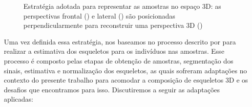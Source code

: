 \begin{figure}[ht!]
    \centering
    \caption{\textmd{Estratégia adotada para representar as amostras no espaço 3D: as perspectivas frontal () e lateral () são posicionadas perpendicularmente para reconstruir uma perspectiva 3D ()}}
    \nomefonte{}
    \label{fig:our-strategy-3d}
\end{figure}


Uma vez definida essa estratégia, nos baseamos no processo descrito por  para realizar a estimativa dos esqueletos para os indivíduos nas amostras. Esse processo é composto pelas etapas de obtenção de amostras, segmentação dos sinais, estimativa e normalização dos esqueletos, as quais sofreram adaptações no contexto do presente trabalho para acomodar a composição de esqueletos 3D e os desafios que encontramos para isso. Discutiremos a seguir as adaptações aplicadas:

